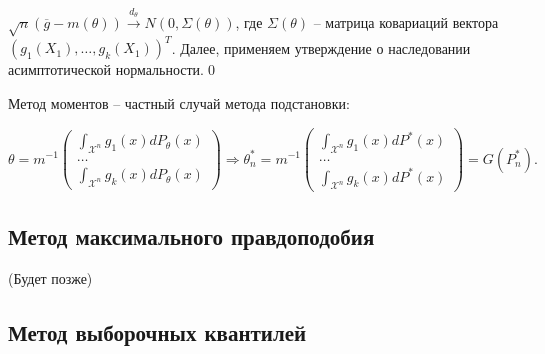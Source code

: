 $\displaystyle \sqrt{n}(\overline{g} -m( \theta ))\xrightarrow{d_{\theta }} N( 0,\Sigma ( \theta ))$, где $\displaystyle \Sigma ( \theta )$ -- матрица ковариаций вектора $\displaystyle ( g_{1}( X_{1}) ,\dotsc ,g_{k}( X_{1}))^{T}$. Далее, применяем утверждение о наследовании асимптотической нормальности.\qed 
\begin{note}
Метод моментов -- частный случай метода подстановки:


\begin{equation*}
\theta =m^{-1}\begin{pmatrix}
\int _{\mathcal{X}^{n}} g_{1}( x) dP_{\theta }( x)\\
\dotsc \\
\int _{\mathcal{X}^{n}} g_{k}( x) dP_{\theta }( x)
\end{pmatrix} \Rightarrow \theta _{n}^{*} =m^{-1}\begin{pmatrix}
\int _{\mathcal{X}^{n}} g_{1}( x) dP^{*}( x)\\
\dotsc \\
\int _{\mathcal{X}^{n}} g_{k}( x) dP^{*}( x)
\end{pmatrix} =G\left( P_{n}^{*}\right) .
\end{equation*}
\end{note}
\subsection{Метод максимального правдоподобия}

(Будет позже)
\subsection{Метод выборочных квантилей}

